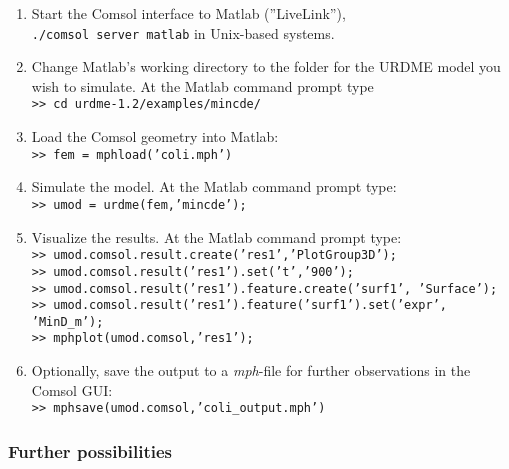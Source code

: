 \begin{enumerate}

\item Start the Comsol interface to Matlab (''LiveLink''), \\ \texttt{./comsol server matlab} in Unix-based systems.

  \item Change Matlab's working directory to the folder for the URDME
    model you wish to simulate. At the Matlab command prompt type \\
    \texttt{>> cd urdme-1.2/examples/mincde/}

\item Load the Comsol geometry into Matlab: \\ \texttt{>> fem = mphload('coli.mph')}

\item Simulate the model. At the Matlab command prompt  type:\\ 
  \texttt{>> umod = urdme(fem,'mincde');} 

\item Visualize the results. At the Matlab command prompt type:\\ 
  \texttt{>> umod.comsol.result.create('res1','PlotGroup3D');} \\
  \texttt{>> umod.comsol.result('res1').set('t','900');} \\
  \texttt{>> umod.comsol.result('res1').feature.create('surf1', 'Surface');} \\
  \texttt{>> umod.comsol.result('res1').feature('surf1').set('expr', 'MinD\_m');} \\
  \texttt{>> mphplot(umod.comsol,'res1');} 

\item Optionally, save the output to a \textit{mph}-file for further observations in the Comsol GUI: \\
\texttt{>> mphsave(umod.comsol,'coli\_output.mph')}

\end{enumerate}

\subsubsection{Further possibilities}

